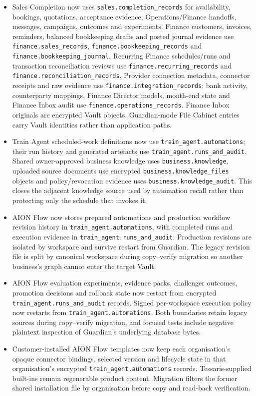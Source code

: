 \documentclass[11pt]{article}
\begin{document}
\begin{itemize}
  \item Sales Completion now uses \texttt{sales.completion\_records} for availability, bookings, quotations, acceptance evidence, Operations/Finance handoffs, messages, campaigns, outcomes and experiments. Finance customers, invoices, reminders, balanced bookkeeping drafts and posted journal evidence use \texttt{finance.sales\_records}, \texttt{finance.bookkeeping\_records} and \texttt{finance.bookkeeping\_journal}. Recurring Finance schedules/runs and transaction reconciliation reviews use \texttt{finance.recurring\_records} and \texttt{finance.reconciliation\_records}. Provider connection metadata, connector receipts and raw evidence use \texttt{finance.integration\_records}; bank activity, counterparty mappings, Finance Director models, month-end state and Finance Inbox audit use \texttt{finance.operations\_records}. Finance Inbox originals are encrypted Vault objects. Guardian-mode File Cabinet entries carry Vault identities rather than application paths.
  \item Train Agent scheduled-work definitions now use \texttt{train\_agent.automations}; their run history and generated artefacts use \texttt{train\_agent.runs\_and\_audit}. Shared owner-approved business knowledge uses \texttt{business.knowledge}, uploaded source documents use encrypted \texttt{business.knowledge\_files} objects and policy/revocation evidence uses \texttt{business.knowledge\_audit}. This closes the adjacent knowledge source used by automation recall rather than protecting only the schedule that invokes it.
  \item AION Flow now stores prepared automations and production workflow revision history in \texttt{train\_agent.automations}, with completed runs and execution evidence in \texttt{train\_agent.runs\_and\_audit}. Production revisions are isolated by workspace and survive restart from Guardian. The legacy revision file is split by canonical workspace during copy--verify migration so another business's graph cannot enter the target Vault.
  \item AION Flow evaluation experiments, evidence packs, challenger outcomes, promotion decisions and rollback state now restart from encrypted \texttt{train\_agent.runs\_and\_audit} records. Signed per-workspace execution policy now restarts from \texttt{train\_agent.automations}. Both boundaries retain legacy sources during copy--verify migration, and focused tests include negative plaintext inspection of Guardian's underlying database bytes.
  \item Customer-installed AION Flow templates now keep each organisation's opaque connector bindings, selected version and lifecycle state in that organisation's encrypted \texttt{train\_agent.automations} records. Tessaris-supplied built-ins remain regenerable product content. Migration filters the former shared installation file by organisation before copy and read-back verification.

\end{itemize}
\end{document}
